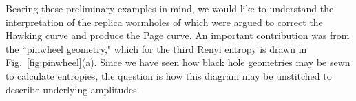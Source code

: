 \documentclass[12pt]{article}
\numberwithin{equation}{section}
\begin{document}
Bearing these preliminary examples in mind, we would like to understand the interpretation of the replica wormholes of \cite{Penington:2019kki, Almheiri:2019qdq} which were argued to correct the Hawking curve and produce the Page curve.  An important contribution was from the ``pinwheel geometry," which for the third Renyi entropy is drawn in Fig.~\ref{fig:pinwheel}(a).  Since we have seen how black hole geometries may be sewn to calculate entropies, the question is how this diagram may be unstitched to describe underlying amplitudes.


\begin{figure}[h!]
\begin{center}
   \hspace{1cm}
\end{center}
\end{figure}
\end{document}
